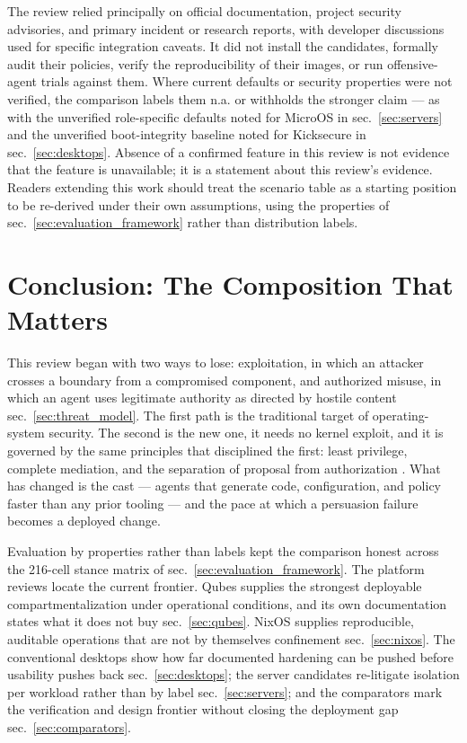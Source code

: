 \documentclass[
  english,
  9pt,
]{extarticle}
\begin{document}
The review relied principally on official documentation, project
security advisories, and primary incident or research reports, with
developer discussions used for specific integration caveats. It did not
install the candidates, formally audit their policies, verify the
reproducibility of their images, or run offensive-agent trials against
them. Where current defaults or security properties were not verified,
the comparison labels them n.a. or withholds the stronger claim --- as
with the unverified role-specific defaults noted for MicroOS in
sec.~\ref{sec:servers} and the unverified boot-integrity baseline noted
for Kicksecure in sec.~\ref{sec:desktops}. Absence of a confirmed
feature in this review is not evidence that the feature is unavailable;
it is a statement about this review's evidence. Readers extending this
work should treat the scenario table as a starting position to be
re-derived under their own assumptions, using the properties of
sec.~\ref{sec:evaluation_framework} rather than distribution labels.

\newpage

\section{Conclusion: The Composition That Matters}\label{sec:conclusion}

This review began with two ways to lose: exploitation, in which an
attacker crosses a boundary from a compromised component, and authorized
misuse, in which an agent uses legitimate authority as directed by
hostile content sec.~\ref{sec:threat_model}. The first path is the
traditional target of operating-system security. The second is the new
one, it needs no kernel exploit, and it is governed by the same
principles that disciplined the first: least privilege, complete
mediation, and the separation of proposal from authorization
\citep{saltzer1975}. What has changed is the cast --- agents that
generate code, configuration, and policy faster than any prior tooling
--- and the pace at which a persuasion failure becomes a deployed
change.

Evaluation by properties rather than labels kept the comparison honest
across the 216-cell stance matrix of
sec.~\ref{sec:evaluation_framework}. The platform reviews locate the
current frontier. Qubes supplies the strongest deployable
compartmentalization under operational conditions, and its own
documentation states what it does not buy sec.~\ref{sec:qubes}. NixOS
supplies reproducible, auditable operations that are not by themselves
confinement sec.~\ref{sec:nixos}. The conventional desktops show how far
documented hardening can be pushed before usability pushes back
sec.~\ref{sec:desktops}; the server candidates re-litigate isolation per
workload rather than by label sec.~\ref{sec:servers}; and the
comparators mark the verification and design frontier without closing
the deployment gap sec.~\ref{sec:comparators}.
\end{document}
